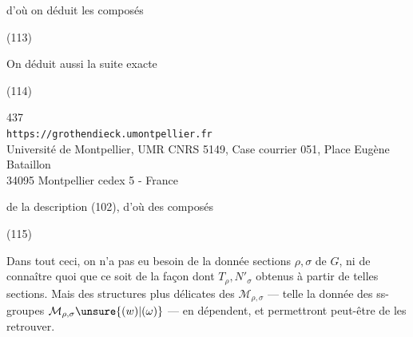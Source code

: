 d'où on déduit les composés

\noindent(113)

On déduit aussi la suite exacte

\noindent(114)


\begin{center}
{\small
437\\
\texttt{https://grothendieck.umontpellier.fr}\\
Université de Montpellier, UMR CNRS 5149, Case courrier 051, Place Eugène Bataillon\\
34095 Montpellier cedex 5 - France
}
\end{center}


de la description (102), d'où des composés

\noindent (115)

Dans tout ceci, on n'a pas eu besoin de la donnée  sections $\rho,\sigma$
de $G$, ni de connaître quoi que ce soit de la façon dont $T_\rho,N'_\sigma$
 obtenus à partir de telles sections.
Mais des structures  plus délicates des
$\mathcal{M}_{\rho,\sigma}$ --- telle la donnée des ss-groupes
 $\mathcal{M}_{\rho,\sigma}\unsure{(w)|(\omega)}$ ---
en dépendent, et permettront peut-être de les retrouver.

